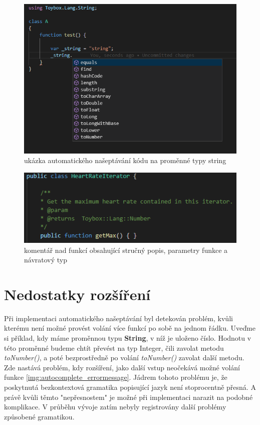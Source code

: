 \begin{figure}[h!]
	\centering
	\includegraphics{images/autocomplete_example}
	\caption{ukázka automatického našeptávání kódu na proměnné typy string}
	\label{img:autocomplete_example}
\end{figure}

\begin{figure}
	\centering
	\includegraphics{images/comments}
	\caption{komentář nad funkcí obsahující stručný popis, parametry funkce a návratový typ}
	\label{img:comments}
\end{figure}



\section{Nedostatky rozšíření}
Při implementaci automatického našeptávání byl detekován problém, kvůli kterému není možné provést volání více funkcí po sobě na jednom řádku. Uveďme si příklad, kdy máme proměnnou typu \textbf{String}, v níž je uloženo číslo. Hodnotu v této proměnné budeme chtít převést na typ Integer, čili zavolat metodu \textit{toNumber()}, a poté bezprostředně po volání \textit{toNumber()} zavolat další metodu. Zde nastává problém, kdy rozšíření, jako další vstup neočekává možné volání funkce \ref{img:autocomplete_errormessage}. Jádrem tohoto problému je, že poskytnutá bezkontextová gramatika popisující jazyk není stoprocentně přesná. A právě kvůli těmto "nepřesnostem" je možné při implementaci narazit na podobné komplikace. V průběhu vývoje zatím nebyly registrovány další problémy způsobené gramatikou.

